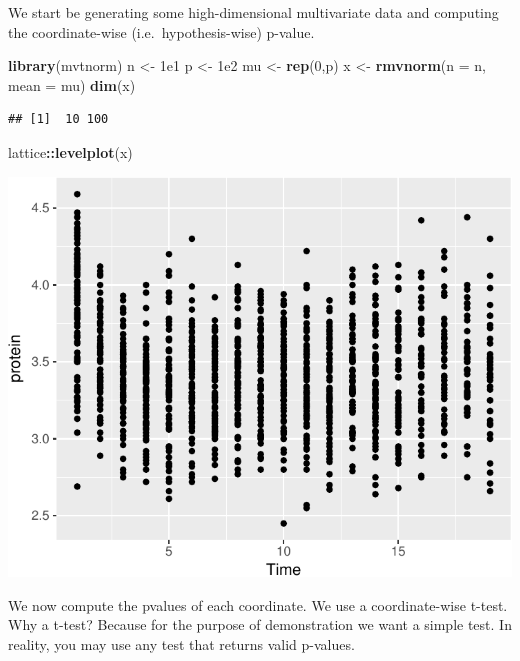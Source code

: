 \documentclass[]{book}
\newenvironment{Shaded}{\begin{snugshade}}{\end{snugshade}}
\newcommand{\ControlFlowTok}[1]{\textcolor[rgb]{0.13,0.29,0.53}{\textbf{#1}}}
\newcommand{\DataTypeTok}[1]{\textcolor[rgb]{0.13,0.29,0.53}{#1}}
\newcommand{\DecValTok}[1]{\textcolor[rgb]{0.00,0.00,0.81}{#1}}
\newcommand{\FloatTok}[1]{\textcolor[rgb]{0.00,0.00,0.81}{#1}}
\newcommand{\KeywordTok}[1]{\textcolor[rgb]{0.13,0.29,0.53}{\textbf{#1}}}
\newcommand{\NormalTok}[1]{#1}
\newcommand{\OperatorTok}[1]{\textcolor[rgb]{0.81,0.36,0.00}{\textbf{#1}}}
\newcommand{\StringTok}[1]{\textcolor[rgb]{0.31,0.60,0.02}{#1}}
\theoremstyle{definition}
\theoremstyle{definition}
\theoremstyle{definition}
\theoremstyle{remark}
\begin{document}
We start be generating some high-dimensional multivariate data and computing the coordinate-wise (i.e.~hypothesis-wise) p-value.

\begin{Shaded}
\begin{Highlighting}[]
\KeywordTok{library}\NormalTok{(mvtnorm)}
\NormalTok{n <-}\StringTok{ }\FloatTok{1e1}
\NormalTok{p <-}\StringTok{ }\FloatTok{1e2}
\NormalTok{mu <-}\StringTok{ }\KeywordTok{rep}\NormalTok{(}\DecValTok{0}\NormalTok{,p)}
\NormalTok{x <-}\StringTok{ }\KeywordTok{rmvnorm}\NormalTok{(}\DataTypeTok{n =}\NormalTok{ n, }\DataTypeTok{mean =}\NormalTok{ mu)}
\KeywordTok{dim}\NormalTok{(x)}
\end{Highlighting}
\end{Shaded}

\begin{verbatim}
## [1]  10 100
\end{verbatim}

\begin{Shaded}
\begin{Highlighting}[]
\NormalTok{lattice}\OperatorTok{::}\KeywordTok{levelplot}\NormalTok{(x)}
\end{Highlighting}
\end{Shaded}

\includegraphics[width=0.5\linewidth]{Rcourse_files/figure-latex/unnamed-chunk-229-1}

We now compute the pvalues of each coordinate.
We use a coordinate-wise t-test.
Why a t-test? Because for the purpose of demonstration we want a simple test. In reality, you may use any test that returns valid p-values.

\begin{Shaded}
\end{Shaded}
\end{document}
